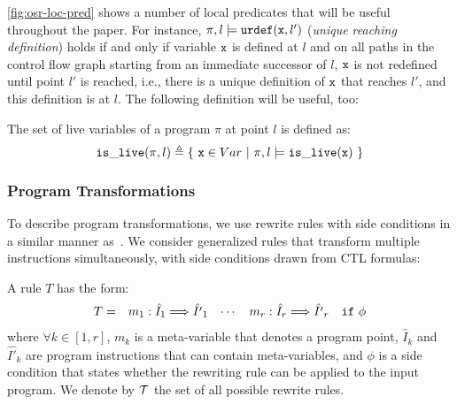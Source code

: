\myfigure\ref{fig:osr-loc-pred} shows a number of local predicates that will be useful throughout the paper. For instance, $\pi,l\models \text{${\tt urdef}$}(\text{${\tt x}$}, l')$ ({\em unique reaching definition}) holds if and only if variable $\text{${\tt x}$}$ is defined at $l$ and on all paths in the control flow graph starting from an immediate successor of $l$, $\text{${\tt x}$}$ is not redefined until point $l'$ is reached, i.e., there is a unique definition of $\text{${\tt x}$}$ that reaches $l'$, and this definition is at $l$. The following definition will be useful, too:

\begin{definition}
\label{de:live-var}
The set of live variables of a program $\pi$ at point $l$ is defined as:
\vspace{-1mm}
\begin{equation*}
\text{${\tt is\_live}$}(\pi,l) \triangleq \{ ~ \text{${\tt x}$}\in Var ~ | ~ \pi, l\models \text{${\tt is\_live}$}(\text{${\tt x}$}) ~ \}
\end{equation*}
\end{definition}


\subsubsection*{Program Transformations}

To describe program transformations, we use rewrite rules with side conditions in a similar manner as~\cite{Lacey04,Kundu09}. We consider generalized rules that transform multiple instructions simultaneously, with side conditions drawn from CTL formulas:

\begin{definition}
\label{de:rewrite-rule}
A rule $T$ has the form:
\vspace{-1mm}
\begin{equation*}
\begin{array}{lllll}
T = & m_1: \hat{I}_1 \Longrightarrow \hat{I'}_1 %
& \cdots
& m_r: \hat{I}_r \Longrightarrow \hat{I'}_r
& {\tt if} ~ \phi
\end{array}
\vspace{-1mm}
\end{equation*}
\noindent where $\forall k\in[1,r]$, $m_k$ is a meta-variable that denotes a program point, $\hat{I}_k$ and $\hat{I'}_k$ are program instructions that can contain meta-variables, and $\phi$ is a side condition that states whether the rewriting rule can be applied to the input program. We denote by $\mathcal{T}$ the set of all possible rewrite rules.
\end{definition}

